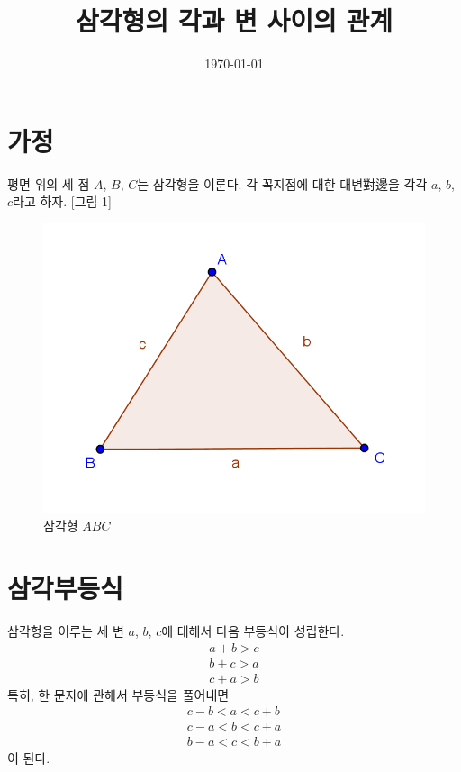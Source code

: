 \documentclass{article}
\begin{document}
\title{삼각형의 각과 변 사이의 관계}
\date{\today}
\author{}
\maketitle
\tableofcontents

\newpage
\section{가정}
평면 위의 세 점 \(A\), \(B\), \(C\)는 삼각형을 이룬다.
각 꼭지점에 대한 대변對邊을 각각 \(a\), \(b\), \(c\)라고 하자.
[그림 1]
\begin{figure}[h]
\center
\includegraphics{1}
\caption{삼각형 \(ABC\)}
\end{figure}

\section{삼각부등식}
삼각형을 이루는 세 변 \(a\), \(b\), \(c\)에 대해서 다음 부등식이 성립한다.
\begin{gather*}
a+b>c\\
b+c>a\\
c+a>b
\end{gather*}
특히, 한 문자에 관해서 부등식을 풀어내면
\begin{gather*}
c-b<a<c+b\\
c-a<b<c+a\\
b-a<c<b+a
\end{gather*}
이 된다.
\end{document}
